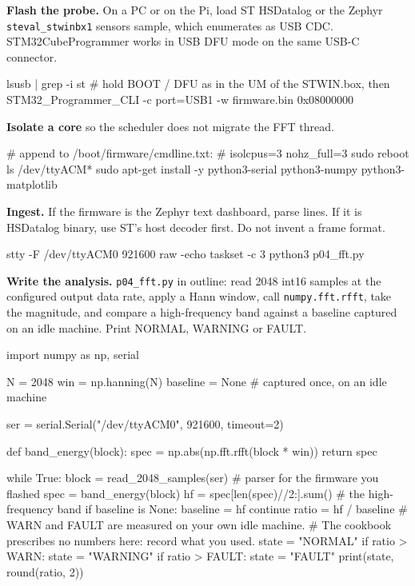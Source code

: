 \begin{steps}
\item \textbf{Flash the probe.} On a PC or on the Pi, load ST HSDatalog or the Zephyr \texttt{steval\_stwinbx1} sensors sample, which enumerates as USB CDC. STM32CubeProgrammer works in USB DFU mode on the same USB-C connector.
\begin{shellcode}
lsusb | grep -i st
# hold BOOT / DFU as in the UM of the STWIN.box, then
STM32_Programmer_CLI -c port=USB1 -w firmware.bin 0x08000000
\end{shellcode}

\item \textbf{Isolate a core} so the scheduler does not migrate the FFT thread.
\begin{shellcode}
# append to /boot/firmware/cmdline.txt:
#   isolcpus=3 nohz_full=3
sudo reboot
ls /dev/ttyACM*
sudo apt-get install -y python3-serial python3-numpy python3-matplotlib
\end{shellcode}

\item \textbf{Ingest.} If the firmware is the Zephyr text dashboard, parse lines. If it is HSDatalog binary, use ST's host decoder first. Do not invent a frame format.
\begin{shellcode}
stty -F /dev/ttyACM0 921600 raw -echo
taskset -c 3 python3 p04_fft.py
\end{shellcode}

\item \textbf{Write the analysis.} \texttt{p04\_fft.py} in outline: read 2048 int16 samples at the configured output data rate, apply a Hann window, call \texttt{numpy.fft.rfft}, take the magnitude, and compare a high-frequency band against a baseline captured on an idle machine. Print NORMAL, WARNING or FAULT.
\begin{pycode}
import numpy as np, serial

N = 2048
win = np.hanning(N)
baseline = None                 # captured once, on an idle machine

ser = serial.Serial("/dev/ttyACM0", 921600, timeout=2)

def band_energy(block):
    spec = np.abs(np.fft.rfft(block * win))
    return spec

while True:
    block = read_2048_samples(ser)      # parser for the firmware you flashed
    spec = band_energy(block)
    hf = spec[len(spec)//2:].sum()      # the high-frequency band
    if baseline is None:
        baseline = hf
        continue
    ratio = hf / baseline
    # WARN and FAULT are measured on your own idle machine.
    # The cookbook prescribes no numbers here: record what you used.
    state = "NORMAL"
    if ratio > WARN:
        state = "WARNING"
    if ratio > FAULT:
        state = "FAULT"
    print(state, round(ratio, 2))
\end{pycode}


\end{steps}
